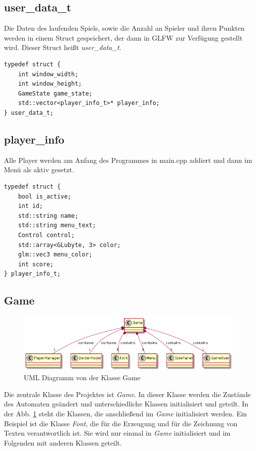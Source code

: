 \documentclass[doktyp=studarbeit]{TUBAFarbeiten}
\begin{document}
\subsection{user\_data\_t}

Die Daten des laufenden Spiels, sowie die Anzahl an Spieler und ihren Punkten
werden in einem Struct gespeichert, der dann in GLFW zur Verfügung gestellt wird.
Dieser Struct heißt \textit{user\_data\_t}.

\begin{lstlisting}[style=C++]
typedef struct {
    int window_width;
    int window_height;
    GameState game_state;
    std::vector<player_info_t>* player_info;
} user_data_t;
\end{lstlisting}

\subsection{player\_info}
Alle Player werden am Anfang des Programmes in main.cpp addiert und dann
im Menü als aktiv gesetzt.

\begin{lstlisting}[style=C++]
typedef struct {
    bool is_active;
    int id;
    std::string name;
    std::string menu_text;
    Control control;
    std::array<GLubyte, 3> color;
    glm::vec3 menu_color;
    int score;
} player_info_t;
\end{lstlisting}

\subsection{Game}

\begin{figure}
    \centering
    \includegraphics[width=0.9\linewidth]{Game.png}
	\caption{UML Diagramm von der Klasse Game}
	\label{fig:game-uml}
\end{figure}

Die zentrale Klasse des Projektes ist \textit{Game}. In dieser Klasse 
werden die Zustände des Automaten geändert und unterschiedliche Klassen 
initialisiert und geteilt. In der Abb. \ref{fig:game-uml} steht die 
Klassen, die anschließend im \textit{Game} initialisiert werden. 
Ein Beispiel ist die Klasse \textit{Font}, die für die Erzeugung und für die
Zeichnung von Texten verantwortlich ist. Sie wird nur einmal in \textit{Game}
initialisiert und im Folgenden mit anderen Klassen geteilt.  
\end{document}
